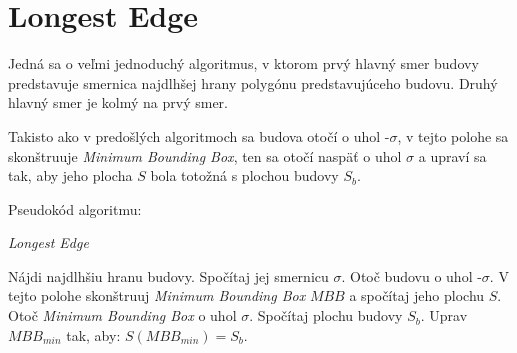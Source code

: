 \documentclass[11pt]{article}
\begin{document}
\section{Longest Edge}\label{le}
Jedná sa o veľmi jednoduchý algoritmus, v ktorom prvý hlavný smer budovy predstavuje smernica najdlhšej hrany polygónu predstavujúceho budovu. Druhý hlavný smer je kolmý na prvý smer.

\noindent Takisto ako v predošlých algoritmoch sa budova otočí o uhol -$\sigma$, v tejto polohe sa skonštruuje \textit{Minimum Bounding Box}, ten sa otočí naspäť o uhol $\sigma$ a upraví sa tak, aby jeho plocha $S$ bola totožná s plochou budovy $S_b$.

\noindent Pseudokód algoritmu:
\begin{algorithm}
    \caption {\textit{Longest Edge}}
    \begin{algorithmic}[1]
        \State Nájdi najdlhšiu hranu budovy.
        \State Spočítaj jej smernicu $\sigma$.
        \State Otoč budovu o uhol -$\sigma$.
        \State V tejto polohe skonštruuj \textit{Minimum Bounding Box} $MBB$ a spočítaj jeho plochu $S$.
        \State Otoč \textit{Minimum Bounding Box} o uhol $\sigma$.
        \State Spočítaj plochu budovy $S_b$.
        \State Uprav $MBB_{min}$ tak, aby: $S(MBB_{min}) = S_b$.
    \end{algorithmic}
\end{algorithm}

\newpage
\end{document}
